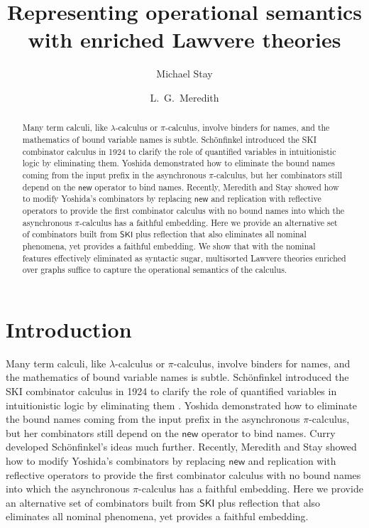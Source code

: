 \documentclass[a4paper,UKenglish]{lipics-v2016}
\title{Representing operational semantics with enriched Lawvere theories}
\author[1]{
Michael Stay
}
\author[2]{
L.\ G.\ Meredith
}
\affil[1]{
  Pyrofex Corp., Kirkland, WA, USA\\
  {\tt stay@pyrofex.net}
}
\affil[2]{
{RChain Cooperative, Seattle, WA, USA}\\
{\tt greg@rchain.coop}
}
\newcommand{\new}{\mathsf{new}}
\newcommand{\pic}{$\pi$-calculus}
\begin{document}
\maketitle
\begin{abstract}
  \noindent
  Many term calculi, like $\lambda$-calculus or {\pic}, involve
  binders for names, and the mathematics of bound variable names is
  subtle.  Sch\"onfinkel introduced the SKI combinator calculus in
  1924 to clarify the role of quantified variables in intuitionistic
  logic by eliminating them. Yoshida demonstrated how to
  eliminate the bound names coming from the input prefix in the
  asynchronous {\pic}, but her combinators still depend on the $\new$
  operator to bind names.  Recently, Meredith and Stay
  showed how to modify Yoshida's combinators by replacing $\new$ and
  replication with reflective operators to provide the first
  combinator calculus with no bound names into which the asynchronous
  {\pic} has a faithful embedding. Here we provide an alternative set
  of combinators built from $\mathsf{SKI}$ plus reflection that also
  eliminates all nominal phenomena, yet provides a faithful
  embedding. We show that with the nominal features effectively
  eliminated as syntactic sugar, multisorted Lawvere theories enriched
  over graphs suffice to capture the operational semantics of the
  calculus.
\end{abstract}
\EnableBpAbbreviations

\section{Introduction}
Many term calculi, like $\lambda$-calculus or {\pic}, involve binders
for names, and the mathematics of bound variable names is subtle.
Sch\"onfinkel introduced the SKI combinator calculus in 1924 to
clarify the role of quantified variables in intuitionistic logic by
eliminating them \cite{finkel}. Yoshida demonstrated how to eliminate
the bound names coming from the input prefix in the asynchronous
{\pic}, but her combinators still depend on the $\new$ operator to
bind names. Curry developed Sch\"onfinkel's ideas much
further. Recently, Meredith and Stay \cite{Rhocomb} showed how to
modify Yoshida's combinators by replacing $\new$ and replication with
reflective operators to provide the first combinator calculus with no
bound names into which the asynchronous {\pic} has a faithful
embedding. Here we provide an alternative set of combinators built
from $\mathsf{SKI}$ plus reflection that also eliminates all nominal
phenomena, yet provides a faithful embedding.
\end{document}
